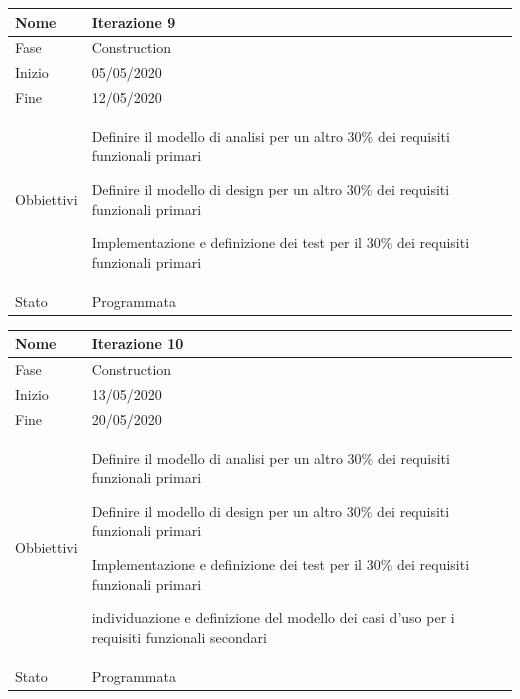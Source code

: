 \begin{center}
\begin{tabular}{ |p{2cm}|p{10cm}|  }
\hline
Nome & Iterazione 9 \\\hline
Fase & Construction \\\hline
Inizio & 05/05/2020 \\\hline
Fine &  12/05/2020  \\\hline
Obbiettivi & 
	\begin{compactitem}
		\item Definire il modello di analisi per un altro 30\% dei requisiti funzionali primari
		\item Definire il modello di design per un altro 30\% dei requisiti funzionali primari
		\item Implementazione e definizione dei test per il 30\% dei requisiti funzionali primari
		
	\end{compactitem}\\\hline
Stato &  Programmata \\\hline
\end{tabular}
\label{table:9}\newline


\begin{tabular}{ |p{2cm}|p{10cm}|  }
\hline
Nome & Iterazione 10 \\\hline
Fase & Construction \\\hline
Inizio & 13/05/2020 \\\hline
Fine &  20/05/2020  \\\hline
Obbiettivi & 
	\begin{compactitem}
		\item Definire il modello di analisi per un altro 30\% dei requisiti funzionali primari
		\item Definire il modello di design per un altro 30\% dei requisiti funzionali primari
		\item Implementazione e definizione dei test per il 30\% dei requisiti funzionali primari
		
		\item individuazione e definizione del modello dei casi d'uso per i requisiti funzionali secondari
	\end{compactitem}\\\hline
Stato &  Programmata \\\hline
\end{tabular}
\label{table:10}\newline


\end{center}
